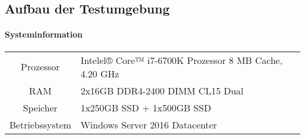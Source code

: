 %
\subsection{Aufbau der Testumgebung}
\paragraph{Systeminformation}
\begin{table}[htb]
\begin{tabularx}{\textwidth}{cXX}
Prozessor & Intelel® Core™ i7-6700K Prozessor 8 MB Cache, 4.20 GHz \\ 
\rowcolor{odd} RAM & 2x16GB DDR4-2400 DIMM CL15 Dual \\
Speicher & 1x250GB SSD + 1x500GB SSD \\ 
\rowcolor{odd} Betriebssystem & Windows Server 2016 Datacenter \\
\end{tabularx}
\end{table}

